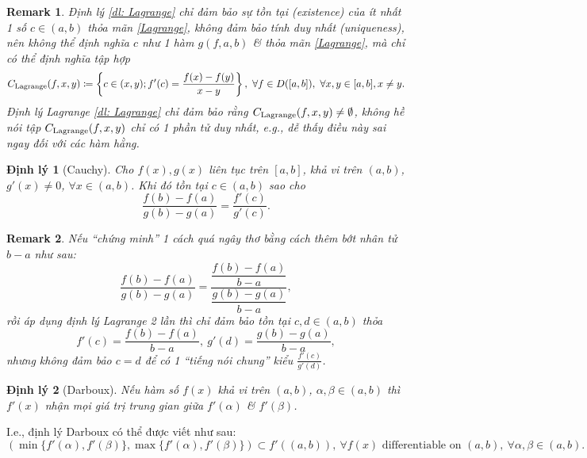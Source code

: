 \documentclass{article}
\newtheorem{dinhly}{Định lý}
\newtheorem{remark}{Remark}
\begin{document}
\begin{remark}
	Định lý \ref{dl: Lagrange} chỉ đảm bảo sự tồn tại (existence) của ít nhất 1 số $c\in(a,b)$ thỏa mãn \eqref{Lagrange}, không đảm bảo tính duy nhất (uniqueness), nên không thể định nghĩa $c$ như 1 hàm $g(f,a,b)$ \& thỏa mãn \eqref{Lagrange}, mà chỉ có thể định nghĩa tập hợp
	\begin{equation*}
		C_{\rm Lagrange}(f,x,y)\coloneqq\left\{c\in(x,y);f'(c) = \dfrac{f(x) - f(y)}{x - y}\right\},\ \forall f\in D([a,b]),\ \forall x,y\in[a,b], x\ne y.
	\end{equation*}
	Định lý Lagrange \ref{dl: Lagrange} chỉ đảm bảo rằng $C_{\rm Lagrange}(f,x,y)\ne\emptyset$, không hề nói tập $C_{\rm Lagrange}(f,x,y)$ chỉ có 1 phần tử duy nhất, e.g., dễ thấy điều này sai ngay đối với các hàm hằng.
\end{remark}

\begin{dinhly}[Cauchy]
	Cho $f(x),g(x)$ liên tục trên $[a,b]$, khả vi trên $(a,b)$, $g'(x)\ne0$, $\forall x\in(a,b)$. Khi đó tồn tại $c\in(a,b)$ sao cho
	\begin{equation*}
		\dfrac{f(b) - f(a)}{g(b) - g(a)} = \dfrac{f'(c)}{g'(c)}.
	\end{equation*}
\end{dinhly}

\begin{remark}
	Nếu ``chứng minh'' 1 cách quá ngây thơ bằng cách thêm bớt nhân tử $b - a$ như sau:
	\begin{equation*}
		\dfrac{f(b) - f(a)}{g(b) - g(a)} = \dfrac{\dfrac{f(b) - f(a)}{b - a}}{\dfrac{g(b) - g(a)}{b - a}},
	\end{equation*}
	rồi áp dụng định lý Lagrange 2 lần thì chỉ đảm bảo tồn tại $c,d\in(a,b)$ thỏa
	\begin{equation*}
		f'(c) = \frac{f(b) - f(a)}{b - a},\ g'(d) = \frac{g(b) - g(a)}{b - a},
	\end{equation*}
	nhưng không đảm bảo $c = d$ để có 1 ``tiếng nói chung'' kiểu $\frac{f'(c)}{g'(d)}$.	
\end{remark}

\begin{dinhly}[Darboux]
	\label{dl: Darboux}
	Nếu hàm số $f(x)$ khả vi trên $(a,b)$, $\alpha,\beta\in(a,b)$ thì $f'(x)$ nhận mọi giá trị trung gian giữa $f'(\alpha)$ \& $f'(\beta)$.
\end{dinhly}
I.e., định lý Darboux có thể được viết như sau:
\begin{equation*}
	(\min\{f'(\alpha),f'(\beta)\},\max\{f'(\alpha),f'(\beta)\})\subset f'((a,b)),\ \forall f(x)\mbox{ differentiable on }(a,b),\ \forall\alpha,\beta\in(a,b).
\end{equation*}
\end{document}
